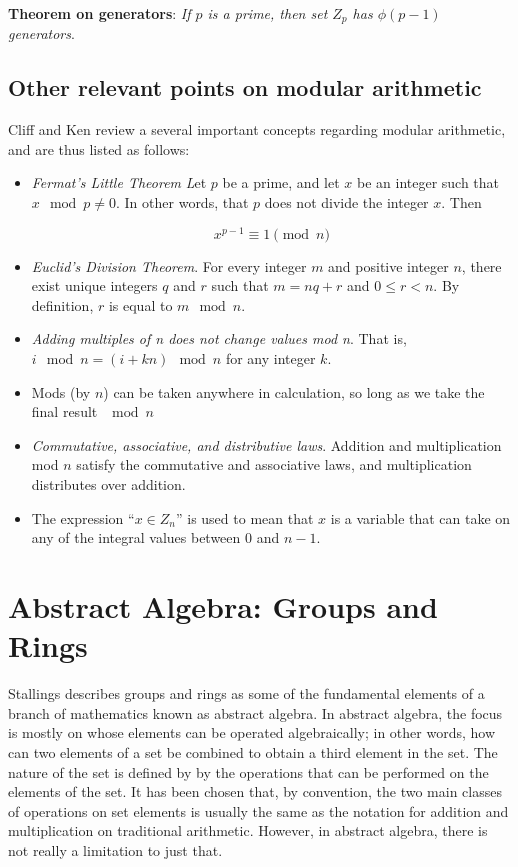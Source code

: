 \textbf{Theorem on generators}: \textit{If $p$ is a prime, then set $Z_{p}$ has $\phi(p-1)$ generators}. 

\subsection{Other relevant points on modular arithmetic}

Cliff and Ken \cite{cs21math19notes} review a several important concepts regarding modular arithmetic, and are thus listed as follows:

\begin{itemize}
\item \textit{Fermat's Little Theorem}
\textit Let $p$ be a prime, and let $x$ be an integer such that $x \mod p \ne 0$. In other words, that $p$ does not divide the integer $x$. Then

\begin{equation}
x^{p-1} \equiv 1 \pmod{n}
\end{equation}

\item \textit{Euclid's Division Theorem}. For every integer $m$ and positive integer $n$, there exist unique integers $q$ and $r$ such that $m=nq+r$ and $0 \leq r < n$. By definition, $r$ is equal to $m \mod n$.

\item \textit{Adding multiples of n does not change values mod n}. That is, $i \mod n= (i+kn) \mod n$ for any integer $k$.

\item Mods (by $n$) can be taken anywhere in calculation, so long as we take the final result $\mod n$

\item \textit{Commutative, associative, and distributive laws}. Addition and multiplication mod $n$ satisfy the commutative and associative laws, and multiplication distributes over addition.

\item The expression ``$x \in Z_{n}$'' is used to mean that $x$ is a variable that can take on any of the integral values between 0 and $n-1$.
\end{itemize}

\section{Abstract Algebra: Groups and Rings}

Stallings \cite{CryptoStallings} describes groups and rings as some of the fundamental elements of a branch of mathematics known as abstract algebra. In abstract algebra, the focus is mostly on whose elements can be operated algebraically; in other words, how can two elements of a set be combined to obtain a third element in the set. The nature of the set is defined by by the operations that can be performed on the elements of the set. It has been chosen that, by convention, the two main classes of operations on set elements is usually the same as the notation for addition and multiplication on traditional arithmetic. However, in abstract algebra, there is not really a limitation to just that.

